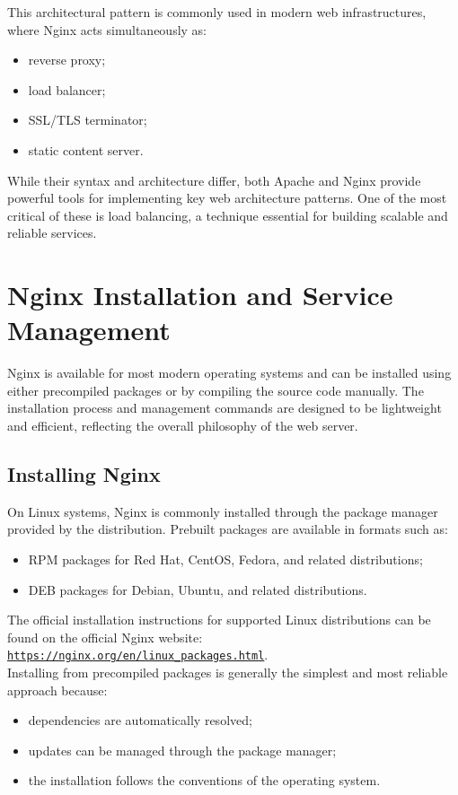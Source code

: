 \documentclass{scrbook}
\begin{document}
	This architectural pattern is commonly used in modern web infrastructures, where Nginx acts simultaneously as:
	\begin{itemize}
		\item reverse proxy;
		\item load balancer;
		\item SSL/TLS terminator;
		\item static content server.
	\end{itemize}
	
	While their syntax and architecture differ, both Apache and Nginx provide powerful tools for implementing key web architecture patterns. One of the most critical of these is load balancing, a technique essential for building scalable and reliable services.
	
	\chapter{Nginx Installation and Service Management}
	
	Nginx is available for most modern operating systems and can be installed using either precompiled packages or by compiling the source code manually. The installation process and management commands are designed to be lightweight and efficient, reflecting the overall philosophy of the web server.
	
	\section{Installing Nginx}
	
	On Linux systems, Nginx is commonly installed through the package manager provided by the distribution. Prebuilt packages are available in formats such as:
	\begin{itemize}
		\item RPM packages for Red Hat, CentOS, Fedora, and related distributions;
		\item DEB packages for Debian, Ubuntu, and related distributions.
	\end{itemize}
	
	The official installation instructions for supported Linux distributions can be found on the official Nginx website: \href{https://nginx.org/en/linux\_packages.htm}{\texttt{https://nginx.org/en/linux\_packages.html}}.\\
	
	Installing from precompiled packages is generally the simplest and most reliable approach because:
	\begin{itemize}
		\item dependencies are automatically resolved;
		\item updates can be managed through the package manager;
		\item the installation follows the conventions of the operating system.
	\end{itemize}
	
\end{document}

